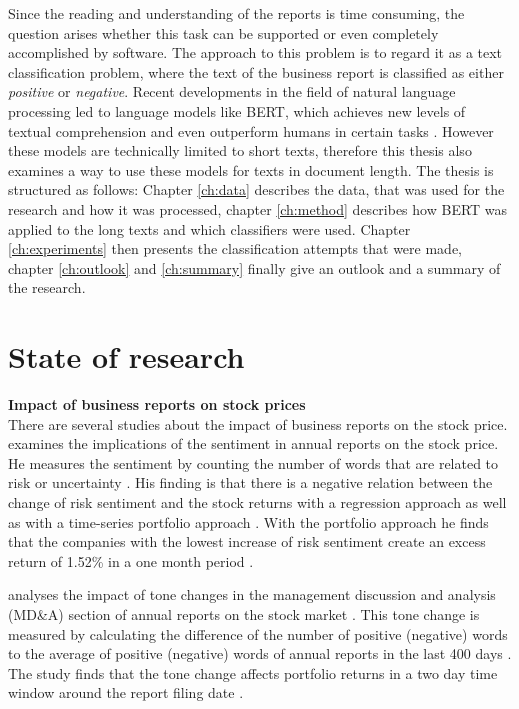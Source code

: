 Since the reading and understanding of the reports is time consuming, the question arises whether this task can be supported or even completely accomplished by software.
The approach to this problem is to regard it as a text classification problem, where the text of the business report is classified as either \textit{positive} or \textit{negative}.
Recent developments in the field of natural language processing led to language models like \acs{BERT}, which achieves new levels of textual comprehension and even outperform humans in certain tasks \cite[p. 7]{Devlin2018}.
However these models are technically limited to short texts, therefore this thesis also examines a way to use these models for texts in document length.
The thesis is structured as follows:
Chapter \ref{ch:data} describes the data, that was used for the research and how it was processed, chapter \ref{ch:method} describes how \acs{BERT} was applied to the long texts and which classifiers were used.
Chapter \ref{ch:experiments} then presents the classification attempts that were made, chapter \ref{ch:outlook} and \ref{ch:summary} finally give an outlook and a summary of the research.
\section{State of research}
\textbf{Impact of business reports on stock prices} \\
There are several studies about the impact of business reports on the stock price.
\cite{Li2006} examines the implications of the sentiment in annual reports on the stock price.
He measures the sentiment by counting the number of words that are related to risk or uncertainty \cite[p. 4]{Li2006}.
His finding is that there is a negative relation between the change of risk sentiment and the stock returns with a regression approach as well as with a time-series portfolio approach \cite[p. 14]{Li2006}.
With the portfolio approach he finds that the companies with the lowest increase of risk sentiment create an excess return of 1.52\% in a one month period \cite[p. 16]{Li2006}.

\cite{Feldman2010} analyses the impact of tone changes in the management discussion and analysis (MD\&A) section of annual reports on the stock market \cite[p. 918]{Feldman2010}.
This tone change is measured by calculating the difference of the number of positive (negative) words to the average of positive (negative) words of annual reports in the last 400 days \cite[p. 927]{Feldman2010}.
The study finds that the tone change affects portfolio returns in a two day time window around the report filing date \cite[pp. 935-936]{Feldman2010}.

